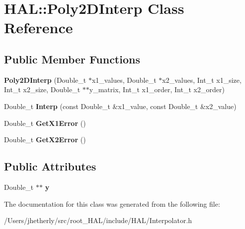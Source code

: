 \hypertarget{class_h_a_l_1_1_poly2_d_interp}{\section{H\+A\+L\+:\+:Poly2\+D\+Interp Class Reference}
\label{class_h_a_l_1_1_poly2_d_interp}
}
\subsection*{Public Member Functions}
\begin{DoxyCompactItemize}
\item 
\hypertarget{class_h_a_l_1_1_poly2_d_interp_a2e06fafe80eb98739813a67a1f5b5f89}{{\bfseries Poly2\+D\+Interp} (Double\+\_\+t $\ast$x1\+\_\+values, Double\+\_\+t $\ast$x2\+\_\+values, Int\+\_\+t x1\+\_\+size, Int\+\_\+t x2\+\_\+size, Double\+\_\+t $\ast$$\ast$y\+\_\+matrix, Int\+\_\+t x1\+\_\+order, Int\+\_\+t x2\+\_\+order)}\label{class_h_a_l_1_1_poly2_d_interp_a2e06fafe80eb98739813a67a1f5b5f89}

\item 
\hypertarget{class_h_a_l_1_1_poly2_d_interp_aaeda2c3c4e09d48611973dcd95940756}{Double\+\_\+t {\bfseries Interp} (const Double\+\_\+t \&x1\+\_\+value, const Double\+\_\+t \&x2\+\_\+value)}\label{class_h_a_l_1_1_poly2_d_interp_aaeda2c3c4e09d48611973dcd95940756}

\item 
\hypertarget{class_h_a_l_1_1_poly2_d_interp_a3488ef8691d670a5f2170a9ebead44d7}{Double\+\_\+t {\bfseries Get\+X1\+Error} ()}\label{class_h_a_l_1_1_poly2_d_interp_a3488ef8691d670a5f2170a9ebead44d7}

\item 
\hypertarget{class_h_a_l_1_1_poly2_d_interp_a9d7ab5e66ee29fe41187d39086152dfe}{Double\+\_\+t {\bfseries Get\+X2\+Error} ()}\label{class_h_a_l_1_1_poly2_d_interp_a9d7ab5e66ee29fe41187d39086152dfe}

\end{DoxyCompactItemize}
\subsection*{Public Attributes}
\begin{DoxyCompactItemize}
\item 
\hypertarget{class_h_a_l_1_1_poly2_d_interp_af07844f91abbfa62348292ae16a90fdc}{Double\+\_\+t $\ast$$\ast$ {\bfseries y}}\label{class_h_a_l_1_1_poly2_d_interp_af07844f91abbfa62348292ae16a90fdc}

\end{DoxyCompactItemize}


The documentation for this class was generated from the following file\+:\begin{DoxyCompactItemize}
\item 
/\+Users/jhetherly/src/root\+\_\+\+H\+A\+L/include/\+H\+A\+L/Interpolator.\+h\end{DoxyCompactItemize}
